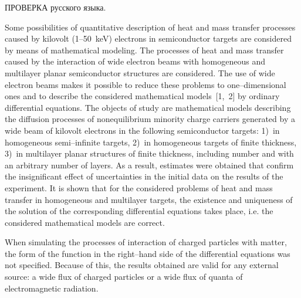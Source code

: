 


\vzmscaption

ПРОВЕРКА русского языка.

Some possibilities of quantitative description of heat and mass transfer processes caused by kilovolt (1--50~keV) electrons in semiconductor targets are considered by means of ma\-the\-ma\-ti\-cal modeling. The processes of heat and mass transfer cau\-sed by the interaction of wide electron beams with homogeneous and multilayer planar semiconductor structures are considered. The use of wide electron beams makes it possible to reduce these problems to one--dimensional ones and to describe the con\-si\-de\-red mathematical models~[1,~2] by ordinary differential equations. The objects of study are mathematical models des\-cri\-bing the diffusion processes of nonequilibrium minority cha\-rge carriers generated by a wide beam of kilovolt electrons in the following semiconductor targets: 1)~in homogeneous semi--in\-fi\-nite targets, 2)~in homogeneous targets of finite thickness, 3)~in multilayer planar structures of finite thickness, including number and with an arbitrary number of layers. As a result, estimates were ob\-tai\-ned that confirm the insignificant effect of un\-cer\-tain\-ties in the initial data on the results of the experiment. It is shown that for the considered problems of heat and mass transfer in homogeneous and multilayer targets, the existence and uni\-que\-ness of the solution of the corresponding differential equations takes place, i.e. the considered mathematical models are correct.

When simulating the processes of interaction of char\-ged particles with matter, the form of the function in the right--hand side of the differential equations was not specified. Because of this, the results obtained are valid for any external source: a wide flux of charged particles or a wide flux of quanta of electromagnetic radiation.

